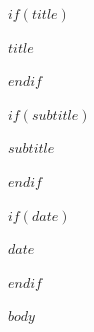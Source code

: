 \documentclass[10pt,a4paper]{article}
\begin{document}
$if(title)$
{\Huge\bfseries\color{TitleColor}$title$\par}
\vspace{0.35em}
$endif$

$if(subtitle)$
{\large\color{AccentColor}$subtitle$\par}
\vspace{0.5em}
$endif$

$if(date)$
{\small$date$\par}
\vspace{0.5em}
$endif$

\tableofcontents
\newpage

$body$
\end{document}
